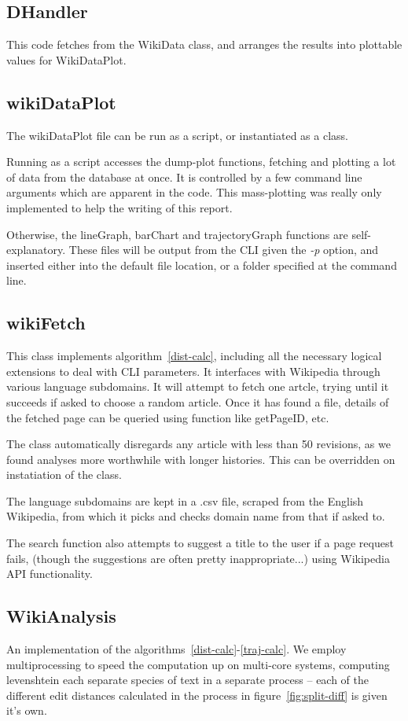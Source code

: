 \subsection*{DHandler}
This code fetches from the WikiData class, and arranges the results
into plottable values for WikiDataPlot.

\subsection*{wikiDataPlot}
The wikiDataPlot file can be run as a script, or instantiated as a
class. 

Running as a script accesses the dump-plot functions, fetching and
plotting a lot of data from the database at once. It is controlled by
a few command line arguments which are apparent in the code. This
mass-plotting was really only implemented to help the writing of this
report.

Otherwise, the lineGraph, barChart and trajectoryGraph functions are
self-explanatory. These files will be output from the CLI given the
\textit{-p} option, and inserted either into the default file
location, or a folder specified at the command line.

\subsection*{wikiFetch}
This class implements algorithm~\ref{dist-calc}, including all the
necessary logical extensions to deal with CLI parameters. It
interfaces with Wikipedia through various language subdomains. It will
attempt to fetch one artcle, trying until it succeeds if asked to
choose a random article. Once it has found a file, details of the
fetched page can be queried using function like getPageID, etc.

The class automatically disregards any article with less than 50
revisions, as we found analyses more worthwhile with longer
histories. This can be overridden on instatiation of the class. 

The language subdomains are kept in a .csv file, scraped from the
English Wikipedia, from which it picks and checks
domain name from that if asked to.

The search function also attempts to suggest a title to the user if a
page request fails, (though the suggestions are often pretty
inappropriate...) using Wikipedia API functionality. 

\subsection*{WikiAnalysis}
An implementation of the
algorithms~\ref{dist-calc}-\ref{traj-calc}. We employ multiprocessing
to speed the computation up on multi-core systems, computing
levenshtein each separate species of text in a separate process --
each of the different edit distances calculated in the process in
figure~\ref{fig:split-diff} is given it's own. 

